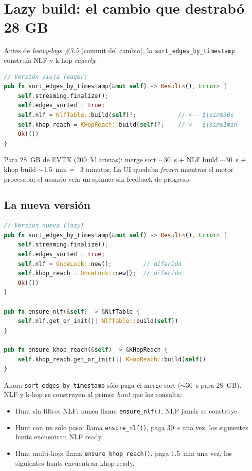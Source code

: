 \section{Lazy build: el cambio que destrabó 28 GB}

Antes de \emph{heavy-logs \#3.5} (commit del cambio), la
\texttt{sort\_edges\_by\_timestamp} construía NLF y k-hop
\emph{eagerly}:

\begin{lstlisting}[language=Rust]
// Versión vieja (eager)
pub fn sort_edges_by_timestamp(&mut self) -> Result<(), Error> {
    self.streaming.finalize();
    self.edges_sorted = true;
    self.nlf = NlfTable::build(self)?;            // <-- $\sim$30s
    self.khop_reach = KHopReach::build(self)?;    // <-- $\sim$1min
    Ok(())
}
\end{lstlisting}

\noindent
Para 28~GB de EVTX (200~M aristas): merge sort $\sim$30~s + NLF
build $\sim$30~s + khop build $\sim$1.5~min = ~3 minutos. La UI
quedaba \emph{frozen} mientras el motor procesaba; el usuario veía
un spinner sin feedback de progreso.

\subsection{La nueva versión}

\begin{lstlisting}[language=Rust]
// Versión nueva (lazy)
pub fn sort_edges_by_timestamp(&mut self) -> Result<(), Error> {
    self.streaming.finalize();
    self.edges_sorted = true;
    self.nlf = OnceLock::new();         // diferido
    self.khop_reach = OnceLock::new();  // diferido
    Ok(())
}

pub fn ensure_nlf(&self) -> &NlfTable {
    self.nlf.get_or_init(|| NlfTable::build(self))
}

pub fn ensure_khop_reach(&self) -> &KHopReach {
    self.khop_reach.get_or_init(|| KHopReach::build(self))
}
\end{lstlisting}

\noindent
Ahora \texttt{sort\_edges\_by\_timestamp} sólo paga el merge sort
($\sim$30~s para 28~GB). NLF y k-hop se construyen al primer
\emph{hunt} que los consulta:

\begin{itemize}
    \item Hunt sin filtros NLF: nunca llama \texttt{ensure\_nlf()},
    NLF jamás se construye.
    \item Hunt con un solo paso: llama \texttt{ensure\_nlf()},
    paga 30~s una vez, los siguientes hunts encuentran NLF ready.
    \item Hunt multi-hop: llama \texttt{ensure\_khop\_reach()},
    paga 1.5~min una vez, los siguientes hunts encuentran khop
    ready.
\end{itemize}

